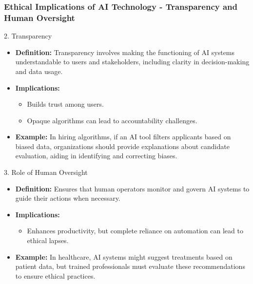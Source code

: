 \documentclass[aspectratio=169]{beamer}
\begin{document}
\begin{frame}[fragile]
    \frametitle{Ethical Implications of AI Technology - Transparency and Human Oversight}
    \begin{block}{2. Transparency}
        \begin{itemize}
            \item \textbf{Definition:} Transparency involves making the functioning of AI systems understandable to users and stakeholders, including clarity in decision-making and data usage.
            \item \textbf{Implications:}
            \begin{itemize}
                \item Builds trust among users.
                \item Opaque algorithms can lead to accountability challenges.
            \end{itemize}
            \item \textbf{Example:} In hiring algorithms, if an AI tool filters applicants based on biased data, organizations should provide explanations about candidate evaluation, aiding in identifying and correcting biases.
        \end{itemize}
    \end{block}

    \begin{block}{3. Role of Human Oversight}
        \begin{itemize}
            \item \textbf{Definition:} Ensures that human operators monitor and govern AI systems to guide their actions when necessary.
            \item \textbf{Implications:}
            \begin{itemize}
                \item Enhances productivity, but complete reliance on automation can lead to ethical lapses.
            \end{itemize}
            \item \textbf{Example:} In healthcare, AI systems might suggest treatments based on patient data, but trained professionals must evaluate these recommendations to ensure ethical practices.
        \end{itemize}
    \end{block}
\end{frame}
\end{document}
